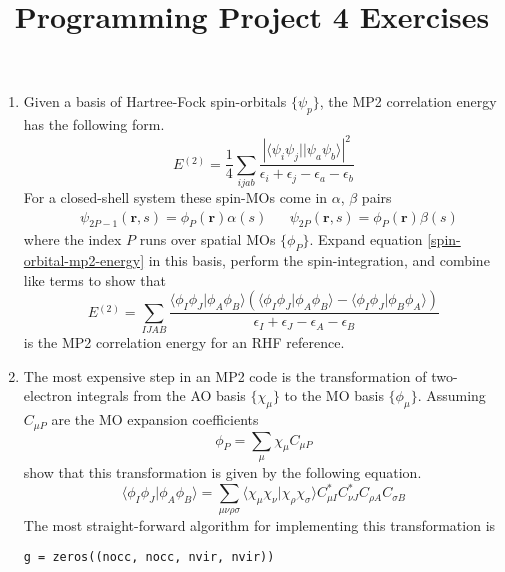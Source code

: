 \documentclass[11pt]{article}
\title{Programming Project 4 Exercises}
\author{}
\date{}
\renewcommand{\a}{\alpha}    %
\renewcommand{\b}{\beta}     %
\newcommand{\ev}{\epsilon}   %
\newcommand{\si}{\sigma}     %
\newcommand{\f}{\phi}        %
\newcommand{\x}{\chi}        %
\newcommand{\y}{\psi}        %
\newcommand{\ord}[1]{\ensuremath{^{(#1)}}}
\newcommand{\bo}[1]{\ensuremath{\mathbf{#1}}}
\newcommand{\pr}[1]{\ensuremath{\left(#1\right)}}
\newcommand{\fr}[2]{\ensuremath{\dfrac{#1}{#2}}}
\newcommand{\ip}[1]{\ensuremath{\langle#1\rangle}}
\begin{document}
\maketitle

\begin{enumerate}
  \item
  Given a basis of Hartree-Fock spin-orbitals $\{\y_p\}$, the MP2 correlation energy has the following form.
\begin{equation}
  \label{spin-orbital-mp2-energy}
  E\ord{2}
=
  \fr{1}{4}
  \sum_{ijab}
  \fr{|\ip{\y_i\y_j||\y_a\y_b}|^2}{\ev_i+\ev_j-\ev_a-\ev_b}
\end{equation}
  For a closed-shell system these spin-MOs come in $\a$, $\b$ pairs
\begin{align}
&
  \y_{2P-1}(\bo{r}, s) = \f_P(\bo{r})\a(s)
&&
  \y_{2P}(\bo{r}, s) = \f_P(\bo{r})\b(s)
\end{align}
  where the index $P$ runs over spatial MOs $\{\f_P\}$.
  Expand equation \ref{spin-orbital-mp2-energy} in this basis, perform the spin-integration, and combine like terms to show that
\begin{equation}
  E\ord{2}
=
  \sum_{IJAB}
  \fr{\ip{\f_I\f_J|\f_A\f_B}\pr{\ip{\f_I\f_J|\f_A\f_B} - \ip{\f_I\f_J|\f_B\f_A}}}
     {\ev_I+\ev_J-\ev_A-\ev_B}
\end{equation}
  is the MP2 correlation energy for an RHF reference.
  \item
  The most expensive step in an MP2 code is the transformation of two-electron integrals from the AO basis $\{\x_\mu\}$ to the MO basis $\{\f_\mu\}$.
  Assuming $C_{\mu P}$ are the MO expansion coefficients 
\begin{equation}
  \f_P
=
  \sum_{\mu} \x_\mu C_{\mu P}
\end{equation}
  show that this transformation is given by the following equation.
\begin{equation}
  \ip{\f_I\f_J|\f_A\f_B}
=
  \sum_{\mu\nu\rho\si}
  \ip{\x_\mu\x_\nu|\x_\rho\x_\si}
  C_{\mu I}^*C_{\nu J}^* C_{\rho A} C_{\si B}
\end{equation}
  The most straight-forward algorithm for implementing this transformation is
\begin{lstlisting}
g = zeros((nocc, nocc, nvir, nvir))


\end{lstlisting}
\end{enumerate}
\end{document}
